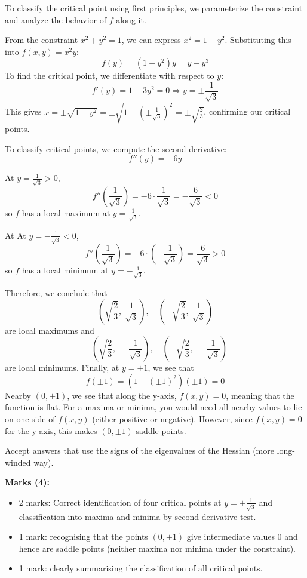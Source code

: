 \documentclass{article}
\begin{document}
\begin{enumerate}[label=(\alph*)]
\begin{mdframed}[linecolor=black, linewidth=1pt]
    To classify the critical point using first principles, we parameterize the constraint and analyze the behavior of $f$ along it.

    From the constraint $x^2+y^2=1$, we can express $x^2 = 1-y^2$. Substituting this into $f(x,y)=x^2y$:
    \[
    f(y) = (1-y^2)y = y - y^3
    \]
    To find the critical point, we differentiate with respect to $y$:
    \[
    f'(y) = 1-3y^2 = 0 \Rightarrow y = \pm \frac{1}{\sqrt{3}}
    \]
    This gives $x = \pm \sqrt{1-y^2} = \pm \sqrt{1 - \left(\pm \frac{1}{\sqrt{3}}\right)^2} = \pm \sqrt{\frac{2}{3}}$, confirming our critical points.

    To classify critical points, we compute the second derivative:
    \[
    f''(y) = -6y
    \]

    At $y= \frac{1}{\sqrt{3}} > 0$,
    \[
    f''\left(\frac{1}{\sqrt{3}}\right) = -6 \cdot \frac{1}{\sqrt{3}} = -\frac{6}{\sqrt{3}} < 0
    \]
    so $f$ has a local maximum at $y=\frac{1}{\sqrt{3}}$.

    At At $y= -\frac{1}{\sqrt{3}} < 0$,
    \[
    f''\left(\frac{1}{\sqrt{3}}\right) = -6 \cdot \left( -\frac{1}{\sqrt{3}}\right) = \frac{6}{\sqrt{3}} > 0
    \]
    so $f$ has a local minimum at $y=-\frac{1}{\sqrt{3}}$.

    Therefore, we conclude that 
    \[
    \left(\sqrt{\frac{2}{3}},\ \frac{1}{\sqrt{3}}\right),\quad
    \left(-\sqrt{\frac{2}{3}},\ \frac{1}{\sqrt{3}}\right)
    \]
    are local maximums and
    \[
    \quad
    \left(\sqrt{\frac{2}{3}},\ -\frac{1}{\sqrt{3}}\right),\quad
    \left(-\sqrt{\frac{2}{3}},\ -\frac{1}{\sqrt{3}}\right)
    \]
    are local minimums. Finally, at $y=\pm1$, we see that 
    \[
    f(\pm1) = (1-(\pm1)^2)(\pm1) = 0
    \]
    Nearby $(0,\pm1)$, we see that along the y-axis, $f(x,y)=0$, meaning that the function is flat. For a maxima or minima, you would need all nearby values to lie on one side of $f(x,y)$ (either positive or negative). However, since $f(x,y)=0$ for the y-axis, this makes $(0,\pm1)$ saddle points.

    Accept answers that use the signs of the eigenvalues of the Hessian (more long-winded way).
    
    \textbf{Marks (4):}
    \begin{itemize}
      \item 2 marks: Correct identification of four critical points at $y = \pm \frac{1}{\sqrt{3}}$ and classification into maxima and minima by second derivative test.
      \item 1 mark: recognising that the points $(0,\pm1)$ give intermediate values $0$ and hence are saddle points (neither maxima nor minima under the constraint).
      \item 1 mark: clearly summarising the classification of all critical points.
    \end{itemize}
    \end{mdframed}


\end{enumerate}
\end{document}
